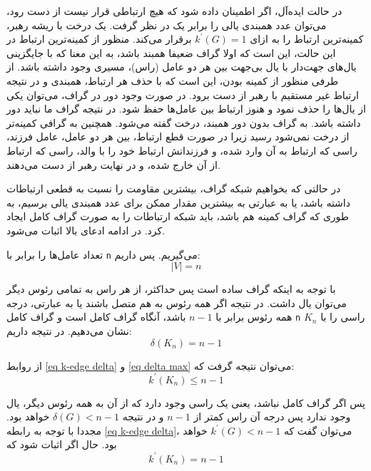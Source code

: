 در حالت ایده‌آل، اگر اطمینان داده شود که هیچ ارتباطی قرار نیست از دست رود، می‌توان عدد همبندی یالی را برابر یک در نظر گرفت. یک درخت با ریشه رهبر، کمینه‌ترین ارتباط را به ازای 
$k^\prime(G) = 1$ 
برقرار می‌کند. منظور از کمینه‌ترین ارتباط در این حالت، این است که اولا گراف ضعیفا همبند باشد، به این معنا که با جایگزینی یال‌های جهت‌دار با یال بی‌جهت بین هر دو عامل (راس)، مسیری وجود داشته باشد. از طرفی منظور از کمینه بودن، این است که با حذف هر ارتباط، همبندی و در نتیجه ارتباط غیر مستقیم با رهبر از دست برود. در صورت وجود دور در گراف، می‌توان یکی از یال‌ها را حذف نمود و هنوز ارتباط بین عامل‌ها حفظ شود. در نتیجه گراف ما نباید دور داشته باشد. به گراف بدون دور همبند، درخت گفته می‌شود. همچنین به گرافی کمینه‌تر از درخت نمی‌شود رسید زیرا در صورت قطع ارتباط، بین هر دو عامل، عامل فرزند، راسی که ارتباط به آن وارد شده، و فرزندانش ارتباط خود را با والد، راسی که ارتباط از آن خارج شده، و در نهایت رهبر از دست می‌دهند.

در حالتی که بخواهیم شبکه گراف، بیشترین مقاومت را نسبت به قطعی ارتباطات داشته باشد، یا به عبارتی به بیشترین مقدار ممکن برای عدد همبندی یالی برسیم، به طوری که گراف کمینه هم باشد، باید شبکه ارتباطات را به صورت گراف کامل ایجاد کرد. در ادامه ادعای بالا اثبات می‌شود.

تعداد عامل‌ها را برابر با \verb|n| می‌گیریم. پس داریم:
\begin{equation}
|V| = n
\end{equation}

با توجه به اینکه گراف ساده است پس حداکثر، از هر راس به تمامی رئوس دیگر می‌توان یال داشت. در نتیجه اگر همه رئوس به هم متصل باشند یا به عبارتی، درجه همه رئوس برابر با 
$n-1$
 باشد، آنگاه گراف کامل است و گراف کامل \verb|n| راسی را با 
$K_n$ 
نشان می‌دهیم. در نتیجه داریم:
\begin{equation}\label{eq delta max}
\delta(K_n) = n-1
\end{equation}

از روابط \ref{eq k-edge delta} و \ref{eq delta max} می‌توان نتیجه گرفت که:
\begin{equation}\label{eq connectivity max}
k^\prime(K_n) \leq n-1
\end{equation}

پس اگر گراف کامل نباشد، یعنی یک راسی وجود دارد که از آن به همه رئوس دیگر، یال وجود ندارد پس درجه آن راس کمتر از 
$n-1$
 و در نتیجه 
$\delta(G) < n-1$ 
خواهد بود. مجددا با توجه به رابطه \ref{eq k-edge delta}، می‌توان گفت که 
$k^\prime(G) < n-1$
خواهد بود. حال اگر اثبات شود که 
\begin{equation}\label{eq edge complete graph}
k^\prime(K_n) = n-1
\end{equation}
 
